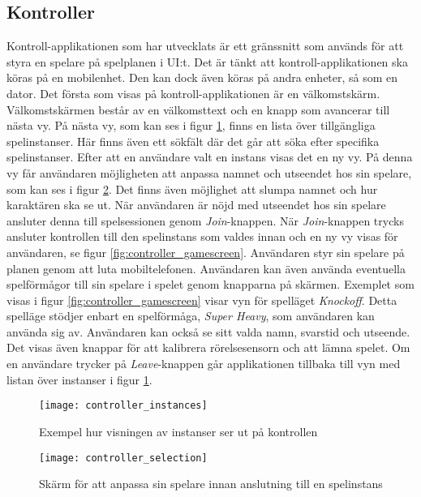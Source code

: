 \subsection{Kontroller}
Kontroll-applikationen som har utvecklats är ett gränssnitt som används för att styra en spelare på spelplanen i UI:t. Det är tänkt att kontroll-applikationen ska köras på en mobilenhet. Den kan dock även köras på andra enheter, så som en dator. Det första som visas på kontroll-applikationen är en välkomstskärm. Välkomstskärmen består av en välkomsttext och en knapp som avancerar till nästa vy. På nästa vy, som kan ses i figur \ref{fig:controller_instances}, finns en lista över tillgängliga spelinstanser. Här finns även ett sökfält där det går att söka efter specifika spelinstanser. Efter att en användare valt en instans visas det en ny vy. På denna vy får användaren möjligheten att anpassa namnet och utseendet hos sin spelare, som kan ses i figur \ref{fig:controller_selection}. Det finns även möjlighet att slumpa namnet och hur karaktären ska se ut. När användaren är nöjd med utseendet hos sin spelare ansluter denna till spelsessionen genom \textit{Join}-knappen. När \textit{Join}-knappen trycks ansluter kontrollen till den spelinstans som valdes innan och en ny vy visas för användaren, se figur \ref{fig:controller_gamescreen}. Användaren styr sin spelare på planen genom att luta mobiltelefonen. Användaren kan även använda eventuella spelförmågor till sin spelare i spelet genom knapparna på skärmen. Exemplet som visas i figur \ref{fig:controller_gamescreen} visar vyn för spelläget \textit{Knockoff}. Detta spelläge stödjer enbart en spelförmåga, \textit{Super Heavy}, som användaren kan använda sig av. Användaren kan också se sitt valda namn, svarstid och utseende. Det visas även knappar för att kalibrera rörelsesensorn och att lämna spelet. Om en användare trycker på \textit{Leave}-knappen går applikationen tillbaka till vyn med listan över instanser i figur \ref{fig:controller_instances}.

\begin{figure}[h]
    \centering
    \texttt{[image: controller\_instances]}
    \caption{Exempel hur visningen av instanser ser ut på kontrollen}
    \label{fig:controller_instances}
\end{figure}

\begin{figure}[H]
    \centering
    \texttt{[image: controller\_selection]}
    \caption{Skärm för att anpassa sin spelare innan anslutning till en spelinstans}
    \label{fig:controller_selection}
\end{figure}

